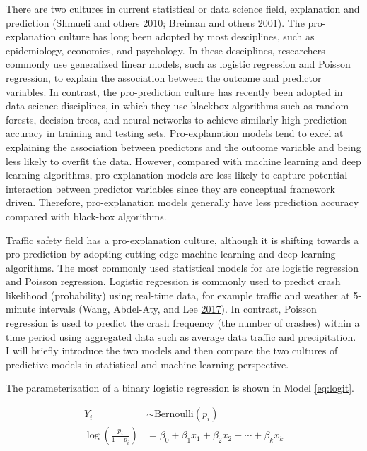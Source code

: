\documentclass[12pt]{book}
\numberwithin{equation}{chapter}
\begin{document}
There are two cultures in current statistical or data science field, explanation and prediction (Shmueli and others \protect\hyperlink{ref-shmueli2010explain}{2010}; Breiman and others \protect\hyperlink{ref-breiman2001statistical}{2001}). The pro-explanation culture has long been adopted by most desciplines, such as epidemiology, economics, and psychology. In these desciplines, researchers commonly use generalized linear models, such as logistic regression and Poisson regression, to explain the association between the outcome and predictor variables. In contrast, the pro-prediction culture has recently been adopted in data science disciplines, in which they use blackbox algorithms such as random forests, decision trees, and neural networks to achieve similarly high prediction accuracy in training and testing sets. Pro-explanation models tend to excel at explaining the association between predictors and the outcome variable and being less likely to overfit the data. However, compared with machine learning and deep learning algorithms, pro-explanation models are less likely to capture potential interaction between predictor variables since they are conceptual framework driven. Therefore, pro-explanation models generally have less prediction accuracy compared with black-box algorithms.

Traffic safety field has a pro-explanation culture, although it is shifting towards a pro-prediction by adopting cutting-edge machine learning and deep learning algorithms. The most commonly used statistical models for are logistic regression and Poisson regression. Logistic regression is commonly used to predict crash likelihood (probability) using real-time data, for example traffic and weather at 5-minute intervals (Wang, Abdel-Aty, and Lee \protect\hyperlink{ref-wang2017safety}{2017}). In contrast, Poisson regression is used to predict the crash frequency (the number of crashes) within a time period using aggregated data such as average data traffic and precipitation. I will briefly introduce the two models and then compare the two cultures of predictive models in statistical and machine learning perspective.

The parameterization of a binary logistic regression is shown in Model \eqref{eq:logit}.

\begin{equation}
\begin{split}
Y_i & \sim \text{Bernoulli}(p_i) \\
\log(\frac{p_i}{1 - p_i}) & = \beta_0 + \beta_1x_1 + \beta_2x_2 + \cdots + \beta_kx_k
\label{eq:logit}
\end{split}
\end{equation}
\end{document}
